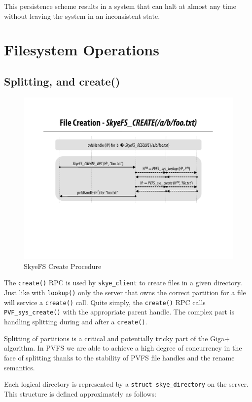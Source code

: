 \documentclass[letterpaper]{article}
\newcommand{\code}[1]{\texttt{#1}}
\begin{document}
This persistence scheme results in a system that can halt at almost any time
without leaving the system in an inconsistent state.

\section{Filesystem Operations}
\subsection{Splitting, and create()}
\begin{figure}
\begin{center}
\includegraphics[scale=0.4]{figure-create}
\end{center}
\caption{SkyeFS Create Procedure}
\end{figure}
The \code{create()} RPC is used by \code{skye\_\-client} to create files in a given
directory.  Just like with \code{lookup()} only the server that owns the correct
partition for a file will service a \code{create()} call.  Quite simply, the
\code{create()} RPC calls \code{PVF\_\-sys\_\-create()} with the appropriate
parent handle.  The complex part is handling splitting during and after a
\code{create()}.

Splitting of partitions is a critical and potentially tricky part of the Giga+
algorithm.  In PVFS we are able to achieve a high degree of concurrency in the
face of splitting thanks to the stability of PVFS file handles and the rename
semantics.

Each logical directory is represented by a \code{struct skye\_\-directory} on
the server.  This structure is defined approximately as follows:
\end{document}

